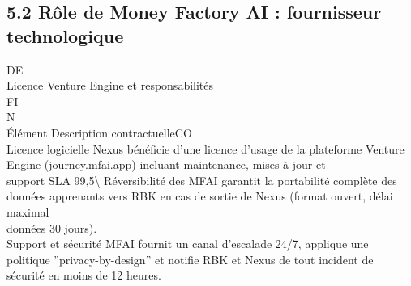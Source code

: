\subsection{5.2 Rôle de Money Factory AI : fournisseur technologique}
\vspace{0.5em}
\vspace{0.5em}
\vspace{0.5em}
\vspace{0.5em}
DE\\
Licence Venture Engine et responsabilités\\
\vspace{0.5em}
\vspace{0.5em}
\vspace{0.5em}
\vspace{0.5em}
FI\\
N\\
Élément                      Description contractuelleCO\\
Licence logicielle           Nexus bénéficie d’une licence d’usage de la plateforme Venture Engine (journey.mfai.app) incluant maintenance, mises à jour et\\
support SLA 99,5\textbackslash{}%
Réversibilité des            MFAI garantit la portabilité complète des données apprenants vers RBK en cas de sortie de Nexus (format ouvert, délai maximal\\
données                      30 jours).\\
Support et sécurité          MFAI fournit un canal d’escalade 24/7, applique une politique ”privacy-by-design” et notifie RBK et Nexus de tout incident de\\
sécurité en moins de 12 heures.\\
\vspace{0.5em}
\vspace{0.5em}
\vspace{0.5em}
\vspace{0.5em}
